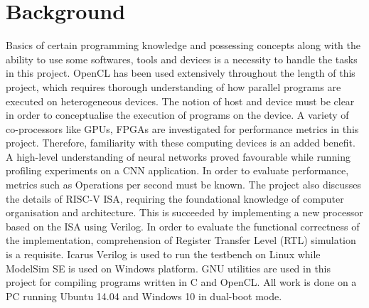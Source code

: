 \chapter{Background}
\label{ch2_background}

Basics of certain programming knowledge and possessing concepts along with the ability to use some softwares, tools and devices is a necessity to handle the tasks in this project. OpenCL has been used extensively throughout the length of this project, which requires thorough understanding of how parallel programs are executed on heterogeneous devices. The notion of host and device must be clear in order to conceptualise the execution of programs on the device.\newline\newline
A variety of co-processors like GPUs, FPGAs are investigated for performance metrics in this project. Therefore, familiarity with these computing devices is an added benefit. A high-level understanding of neural networks proved favourable while running profiling experiments on a CNN application. In order to evaluate performance, metrics such as Operations per second must be known.\newline\newline
The project also discusses the details of RISC-V ISA, requiring the foundational knowledge of computer organisation and architecture.  This is succeeded by implementing a new processor based on the ISA using Verilog. In order to evaluate the functional correctness of the implementation, comprehension of Register Transfer Level (RTL) simulation is a requisite.  Icarus Verilog is used to run the testbench on Linux while ModelSim SE is used on Windows platform.\newline\newline
GNU utilities are used in this project for compiling programs written in C and OpenCL. All work is done on a PC running Ubuntu 14.04 and Windows 10 in dual-boot mode.